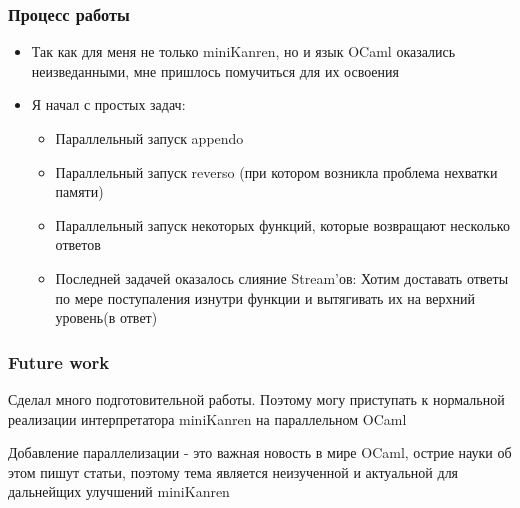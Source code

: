 \documentclass{beamer}
\begin{document}
\begin{frame}
  \frametitle{Процесс работы}
  \begin{itemize}
  \item Так как для меня не только miniKanren, но и язык OCaml оказались неизведанными, мне пришлось помучиться для их освоения
  \item Я начал с простых задач:
  \begin{itemize}
  \item Параллельный запуск appendo
  \item Параллельный запуск reverso (при котором возникла проблема нехватки памяти)
  \item Параллельный запуск некоторых функций, которые возвращают несколько ответов
  \item Последней задачей оказалось слияние Stream'ов: Хотим доставать ответы по мере поступаления изнутри функции и вытягивать их на верхний уровень(в ответ)
  \end{itemize}
  \end{itemize}
  \end{frame}


\begin{frame}[t]
  \frametitle{Future work}
  \begin{center}
  \item Сделал много подготовительной работы. Поэтому могу приступать к нормальной реализации интерпретатора miniKanren на параллельном OCaml
  \item Добавление параллелизации - это важная новость в мире OCaml, острие науки об этом пишут статьи, поэтому тема является неизученной и актуальной для дальнейщих улучшений miniKanren
  \end{center}
  
  \end{frame}
\end{document}
